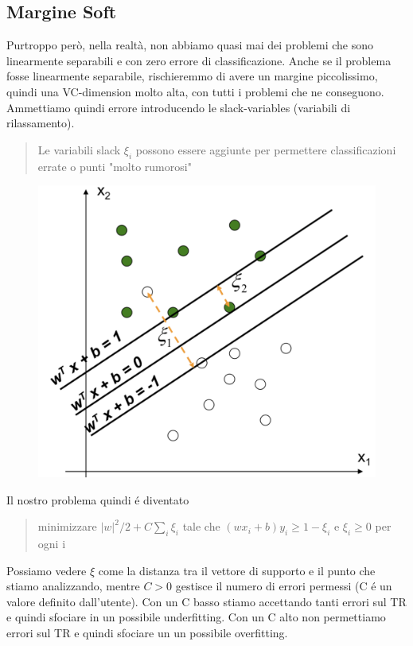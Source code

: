 \documentclass{article}
\begin{document}
\subsection{Margine Soft}
Purtroppo però, nella realtà, non abbiamo quasi mai dei problemi che sono linearmente separabili e con zero errore di classificazione. Anche se il problema fosse linearmente separabile, rischieremmo di avere un margine piccolissimo, quindi una VC-dimension molto alta, con tutti i problemi che ne conseguono. Ammettiamo quindi errore introducendo le slack-variables (variabili di rilassamento). 
\begin{quote}
    Le variabili slack $\xi_i$ possono essere aggiunte per permettere classificazioni errate o punti "molto rumorosi"
\end{quote}
\begin{figure}[H]
\centering
\includegraphics[scale=0.35]{Images/slackvar.png}
\end{figure}
Il nostro problema quindi é diventato 
\begin{quote}
    minimizzare $|w|^2/2+C\sum_i\xi_i$ tale che $(wx_i+b)y_i\geq 1-\xi_i$ e $\xi_i\geq0$ per ogni i
\end{quote}
Possiamo vedere $\xi$ come la distanza tra il vettore di supporto e il punto che stiamo analizzando, mentre $C>0$ gestisce il numero di errori permessi (C é un valore definito dall'utente). Con un C basso stiamo accettando tanti errori sul TR e quindi sfociare in un possibile underfitting. Con un C alto non permettiamo errori sul TR e quindi sfociare un un possibile overfitting. 
\end{document}
